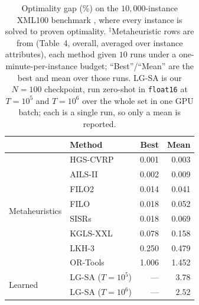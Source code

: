 \documentclass[letterpaper]{article} %
\begin{document}
\begin{table}[t]
\centering
\small
\setlength{\tabcolsep}{6pt}
\begin{tabular}{@{}ll rr@{}}
\toprule
& \textbf{Method} & \textbf{Best} & \textbf{Mean} \\
\midrule
\multirow{8}{*}{Metaheuristics\rlap{$^{\ddagger}$}}
 & HGS-CVRP  & 0.001 & 0.003 \\
 & AILS-II   & 0.002 & 0.009 \\
 & FILO2     & 0.014 & 0.041 \\
 & FILO      & 0.018 & 0.052 \\
 & SISRs     & 0.018 & 0.069 \\
 & KGLS-XXL  & 0.078 & 0.158 \\
 & LKH-3     & 0.250 & 0.479 \\
 & OR-Tools  & 1.006 & 1.452 \\
\midrule
\multirow{2}{*}{Learned}
 & LG-SA ($T{=}10^{5}$) & --- & $3.78$ \\
 & LG-SA ($T{=}10^{6}$) & --- & $2.52$ \\
\bottomrule
\end{tabular}
\caption{Optimality gap (\%) on the $10{,}000$-instance XML100 benchmark
\citep{queiroga_10000_nodate}, where every instance is solved to proven
optimality. $^{\ddagger}$Metaheuristic rows are from \citet{queiroga_xl_2026}
(Table~4, overall, averaged over instance attributes), each method given $10$
runs under a one-minute-per-instance budget; ``Best''/``Mean'' are the best and
mean over those runs. LG-SA is our $N=100$ checkpoint, run zero-shot in
\texttt{float16} at $T=10^{5}$ and $T=10^{6}$ over the whole set in one GPU
batch; each is a single run, so only a mean is reported.}
\label{tab:xml}
\end{table}
\end{document}

